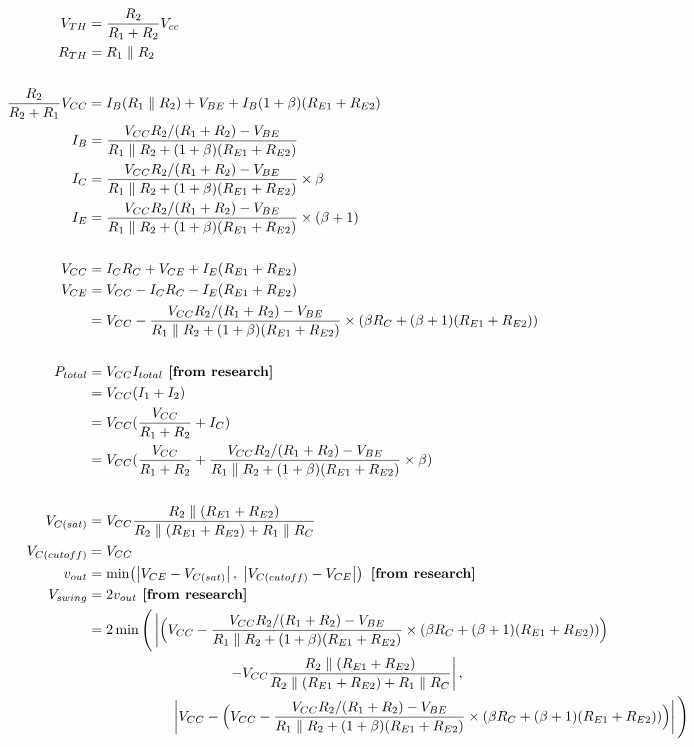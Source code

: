 \documentclass[11pt, a4paper]{article}
\begin{document}
\begin{align*}
    V_{TH} & = \frac{R_2}{R_1 + R_2}V_{cc}\\
    R_{TH} & = R_1 \parallel R_2 \\ \\
    \frac{R_2}{R_2+R_1}V_{CC} &= I_B (R_1 \parallel R_2) + V_{BE} + I_B(1+\beta)(R_{E1}+R_{E2})\\
    I_B &= \frac{V_{CC}R_2/(R_1+R_2)-V_{BE}}{R_1 \parallel R_2 + (1+\beta)(R_{E1}+R_{E2})}\\
    I_C &= \frac{V_{CC}R_2/(R_1+R_2)-V_{BE}}{R_1 \parallel R_2 + (1+\beta)(R_{E1}+R_{E2})} \times \beta\\
    I_E &= \frac{V_{CC}R_2/(R_1+R_2)-V_{BE}}{R_1 \parallel R_2 + (1+\beta)(R_{E1}+R_{E2})} \times (\beta + 1)\\ \\
    V_{CC} &= I_C R_C + V_{CE} + I_E (R_{E1}+R_{E2})\\
    V_{CE} &= V_{CC} - I_C R_C - I_E (R_{E1}+R_{E2})\\
    & = V_{CC} - \frac{V_{CC}R_2/(R_1+R_2)-V_{BE}}{R_1 \parallel R_2 + (1+\beta)(R_{E1}+R_{E2})} \times (\beta R_C + (\beta + 1) (R_{E1}+R_{E2}))\\ \\
    P_{total} &= V_{CC} I_{total} \textbf{ [from research]}\\
    &= V_{CC} (I_1 + I_2)\\ 
    & = V_{CC} (\frac{V_{CC}}{R_1 + R_2} + I_C)\\
    & = V_{CC} (\frac{V_{CC}}{R_1 + R_2} + \frac{V_{CC}R_2/(R_1+R_2)-V_{BE}}{R_1 \parallel R_2 + (1+\beta)(R_{E1}+R_{E2})} \times \beta) \\ \\
    V_{C(sat)} &= V_{CC} \frac{R_2 \parallel (R_{E1}+R_{E2})}{R_2 \parallel (R_{E1}+R_{E2}) + R_1 \parallel R_C} \\
    V_{C(cutoff)} &= V_{CC}\\
    v_{out} &= \min\!\left(\left|V_{CE} - V_{C(sat)}\right|,\; \left|V_{C(cutoff)} - V_{CE}\right|\right) \textbf{ [from research]}\\
    V_{swing} &= 2v_{out} \textbf{ [from research]}\\
    &= 2\min\Bigg(
    \left|\vphantom{\frac{A}{B}}
        \Big(V_{CC} - \frac{V_{CC}R_2/(R_1+R_2)-V_{BE}}{R_1 \parallel R_2 + (1+\beta)(R_{E1}+R_{E2})}
        \times (\beta R_C + (\beta + 1)(R_{E1}+R_{E2}))\Big)\right.\\
    &\qquad\qquad\qquad\qquad\qquad
        \left.- V_{CC} \frac{R_2 \parallel (R_{E1}+R_{E2})}{R_2 \parallel (R_{E1}+R_{E2}) + R_1 \parallel R_C}\right|, \\
    &\qquad\qquad\qquad \left|V_{CC} - \Big(V_{CC}
        - \frac{V_{CC}R_2/(R_1+R_2)-V_{BE}}{R_1 \parallel R_2 + (1+\beta)(R_{E1}+R_{E2})}
        \times (\beta R_C + (\beta + 1)(R_{E1}+R_{E2}))\Big)\right|
    \Bigg)
\end{align*}
\end{document}

